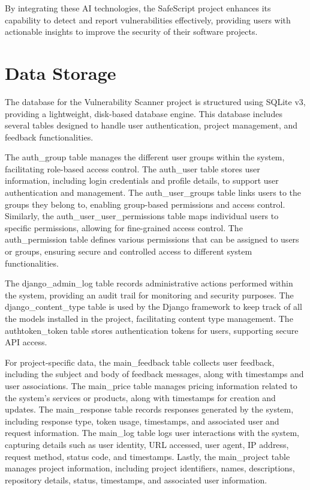 By integrating these AI technologies, the SafeScript project enhances its capability to detect and report vulnerabilities effectively, providing users with actionable insights to improve the security of their software projects.

\section{Data Storage} 

The database for the Vulnerability Scanner project is structured using SQLite v3, providing a lightweight, disk-based database engine. This database includes several tables designed to handle user authentication, project management, and feedback functionalities.

The auth\_group table manages the different user groups within the system, facilitating role-based access control. The auth\_user table stores user information, including login credentials and profile details, to support user authentication and management. The auth\_user\_groups table links users to the groups they belong to, enabling group-based permissions and access control. Similarly, the auth\_user\_user\_permissions table maps individual users to specific permissions, allowing for fine-grained access control. The auth\_permission table defines various permissions that can be assigned to users or groups, ensuring secure and controlled access to different system functionalities.

The django\_admin\_log table records administrative actions performed within the system, providing an audit trail for monitoring and security purposes. The django\_content\_type table is used by the Django framework to keep track of all the models installed in the project, facilitating content type management. The authtoken\_token table stores authentication tokens for users, supporting secure API access.

For project-specific data, the main\_feedback table collects user feedback, including the subject and body of feedback messages, along with timestamps and user associations. The main\_price table manages pricing information related to the system's services or products, along with timestamps for creation and updates. The main\_response table records responses generated by the system, including response type, token usage, timestamps, and associated user and request information. The main\_log table logs user interactions with the system, capturing details such as user identity, URL accessed, user agent, IP address, request method, status code, and timestamps. Lastly, the main\_project table manages project information, including project identifiers, names, descriptions, repository details, status, timestamps, and associated user information.

